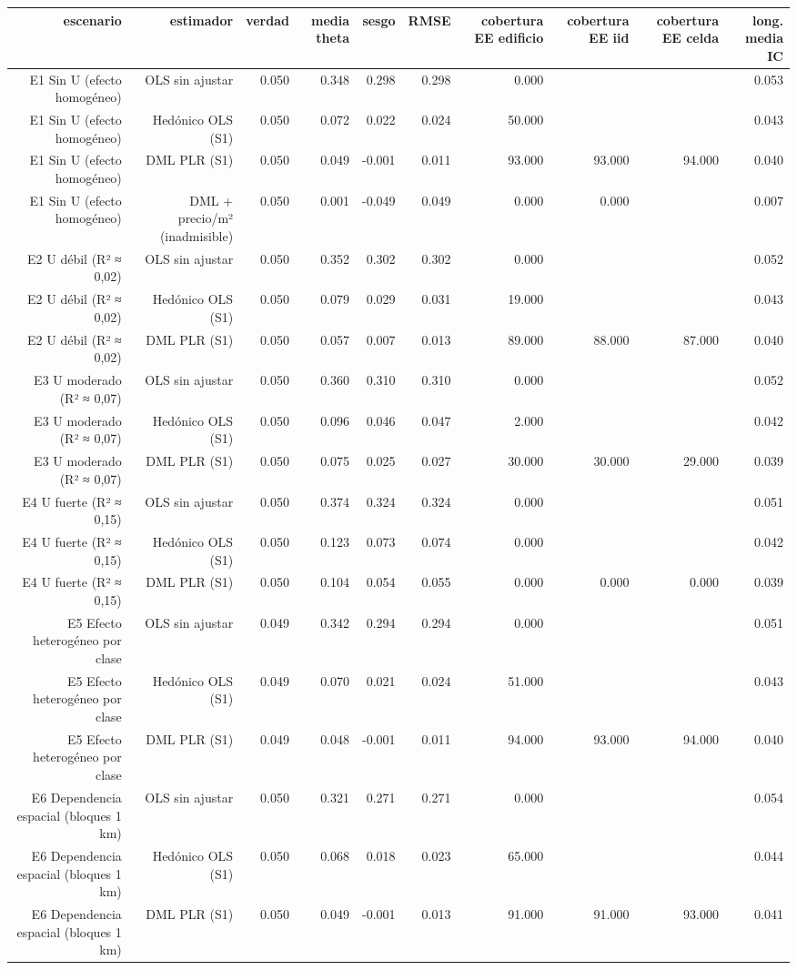 \begin{tabular}{rrrrrrrrrr}
\toprule
escenario & estimador & verdad & media theta & sesgo & RMSE & cobertura EE edificio & cobertura EE iid & cobertura EE celda & long. media IC \\
\midrule
E1 Sin U (efecto homogéneo) & OLS sin ajustar & 0.050 & 0.348 & 0.298 & 0.298 & 0.000 &  &  & 0.053 \\
E1 Sin U (efecto homogéneo) & Hedónico OLS (S1) & 0.050 & 0.072 & 0.022 & 0.024 & 50.000 &  &  & 0.043 \\
E1 Sin U (efecto homogéneo) & DML PLR (S1) & 0.050 & 0.049 & -0.001 & 0.011 & 93.000 & 93.000 & 94.000 & 0.040 \\
E1 Sin U (efecto homogéneo) & DML + precio/m² (inadmisible) & 0.050 & 0.001 & -0.049 & 0.049 & 0.000 & 0.000 &  & 0.007 \\
E2 U débil (R² ≈ 0,02) & OLS sin ajustar & 0.050 & 0.352 & 0.302 & 0.302 & 0.000 &  &  & 0.052 \\
E2 U débil (R² ≈ 0,02) & Hedónico OLS (S1) & 0.050 & 0.079 & 0.029 & 0.031 & 19.000 &  &  & 0.043 \\
E2 U débil (R² ≈ 0,02) & DML PLR (S1) & 0.050 & 0.057 & 0.007 & 0.013 & 89.000 & 88.000 & 87.000 & 0.040 \\
E3 U moderado (R² ≈ 0,07) & OLS sin ajustar & 0.050 & 0.360 & 0.310 & 0.310 & 0.000 &  &  & 0.052 \\
E3 U moderado (R² ≈ 0,07) & Hedónico OLS (S1) & 0.050 & 0.096 & 0.046 & 0.047 & 2.000 &  &  & 0.042 \\
E3 U moderado (R² ≈ 0,07) & DML PLR (S1) & 0.050 & 0.075 & 0.025 & 0.027 & 30.000 & 30.000 & 29.000 & 0.039 \\
E4 U fuerte (R² ≈ 0,15) & OLS sin ajustar & 0.050 & 0.374 & 0.324 & 0.324 & 0.000 &  &  & 0.051 \\
E4 U fuerte (R² ≈ 0,15) & Hedónico OLS (S1) & 0.050 & 0.123 & 0.073 & 0.074 & 0.000 &  &  & 0.042 \\
E4 U fuerte (R² ≈ 0,15) & DML PLR (S1) & 0.050 & 0.104 & 0.054 & 0.055 & 0.000 & 0.000 & 0.000 & 0.039 \\
E5 Efecto heterogéneo por clase & OLS sin ajustar & 0.049 & 0.342 & 0.294 & 0.294 & 0.000 &  &  & 0.051 \\
E5 Efecto heterogéneo por clase & Hedónico OLS (S1) & 0.049 & 0.070 & 0.021 & 0.024 & 51.000 &  &  & 0.043 \\
E5 Efecto heterogéneo por clase & DML PLR (S1) & 0.049 & 0.048 & -0.001 & 0.011 & 94.000 & 93.000 & 94.000 & 0.040 \\
E6 Dependencia espacial (bloques 1 km) & OLS sin ajustar & 0.050 & 0.321 & 0.271 & 0.271 & 0.000 &  &  & 0.054 \\
E6 Dependencia espacial (bloques 1 km) & Hedónico OLS (S1) & 0.050 & 0.068 & 0.018 & 0.023 & 65.000 &  &  & 0.044 \\
E6 Dependencia espacial (bloques 1 km) & DML PLR (S1) & 0.050 & 0.049 & -0.001 & 0.013 & 91.000 & 91.000 & 93.000 & 0.041 \\
\bottomrule
\end{tabular}